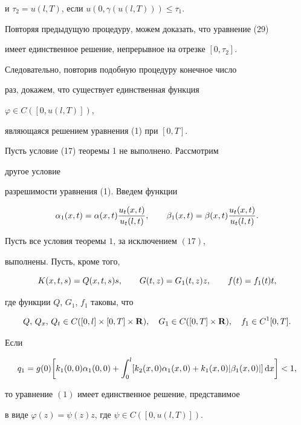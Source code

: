 \begin{pf}
и $\tau_2=u(l,T)$, если $u(0,\gamma (u(l,T)))\leq \tau_1$.


Повторяя предыдущую процедуру, можем доказать, что уравнение (29)


имеет единственное решение, непрерывное на отрезке $[ 0,\tau_2]$.


Следовательно, повторив подобную процедуру конечное число


раз, докажем, что существует единственная функция


$\varphi \in C([0,u(l,T)])$,


являющаяся решением уравнения (1) при $[0,T]$.


\end{pf}





Пусть условие (17) теоремы 1 не выполнено. Рассмотрим


другое условие


разрешимости уравнения (1). Введем функции


$$


\alpha_1(x,t)=\alpha (x,t)\frac{u_t(x,t)}{u_t(l,t)}, \qq


\beta_1(x,t)=\beta (x,t)\frac{u_t(x,t)}{u_t(l,t)}.


$$





\begin{thm}


Пусть все условия теоремы $1$, за исключением $(17)$,


выполнены. Пусть, кроме того,


\begin{equation}


K(x,t,s)=Q(x,t,s)s,\qq  G(t,z)=G_1(t,z)z,\qq


f(t)=f_1(t)t,




\end{equation}


где функции $Q$, $G_1$, $f_1$ таковы, что


$$


Q,\,Q_x,\,Q_t\in C( [ 0,l] \times [ 0,T] \times \rsp ),


\q G_1\in C( [ 0,T] \times \rsp ),\q f_1\in C^1[0,T].


$$


Если


\begin{equation}


q_1 = g(0)\bigg[ k_1(0,0)\alpha_1(0,0)+\int_0^l


[ k_2(x,0)\alpha_1(x,0)+k_1(x,0)| \beta_1(x,0)| ] \d x\bigg]<1,




\end{equation}


то уравнение $(1)$ имеет единственное решение, представимое


в виде $\varphi (z)=\psi (z)z$, где $\psi \in C([0,u(l,T)])$.


\end{thm}





